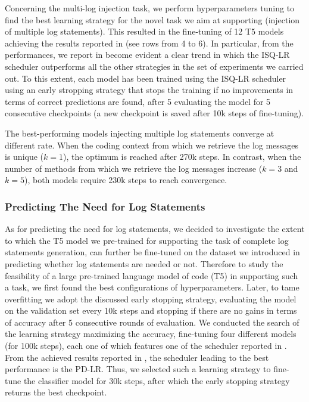 Concerning the multi-log injection task, we perform hyperparameters tuning to find the best learning strategy for the novel task we aim at supporting (\ie injection of multiple log statements). This resulted in the fine-tuning of 12 T5 models achieving the results reported in  (see rows from 4 to 6). In particular, from the performances, we report in  become evident a clear trend in which the ISQ-LR scheduler outperforms all the other strategies in the set of experiments we carried out. To this extent, each model has been trained using the ISQ-LR scheduler using an early stropping strategy that stops the training if no improvements in terms of correct predictions are found, after 5 evaluating the model for 5 consecutive checkpoints (a new checkpoint is saved after 10k steps of fine-tuning).

The best-performing models injecting multiple log statements converge at different rate. When the coding context from which we retrieve the log messages is unique (\ie $k=1$), the optimum is reached after 270k steps. In contrast, when the number of methods from which we retrieve the log messages increase (\ie $k=3$ and $k=5$), both models require 230k steps to reach convergence.

\subsubsection{Predicting The Need for Log Statements}
As for predicting the need for log statements, we decided to investigate the extent to which the T5 model we pre-trained for supporting the task of complete log statements generation, can further be fine-tuned on the dataset we introduced in  predicting whether log statements are needed or not.
Therefore to study the feasibility of a large pre-trained language model of code (\ie T5) in supporting such a task, we first found the best configurations of hyperparameters. Later, to tame overfitting we adopt the discussed early stopping strategy, evaluating the model on the validation set every 10k steps and stopping if there are no gains in terms of accuracy after 5 consecutive rounds of evaluation.
We conducted the search of the learning strategy maximizing the accuracy, fine-tuning four different models (for 100k steps), each one of which features one of the scheduler reported in  . From the achieved results reported in , the scheduler leading to the best performance is the PD-LR. Thus, we selected such a learning strategy to fine-tune the classifier model for 30k steps, after which the early stopping strategy returns the best checkpoint.

